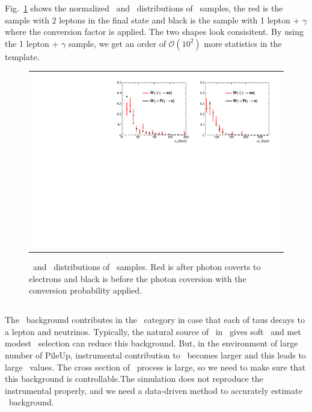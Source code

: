 Fig.~\ref{fig:wgamma_compare} shows the normalized \mll\ and \mt\ distributions 
of \wgamma\ samples, the red is the sample with 2 leptons in the final state 
and black is the sample with 1 lepton + $\gamma$ where the conversion 
factor is applied. The two shapes look consisitent. 
By using the 1 lepton + $\gamma$ sample, we get an order of $\mathcal{O}(10^2)$ 
more statistics in the template.  
\begin{figure}[htp] 
\centering 
\begin{tabular}{c} 
\includegraphics[width=1.0\textwidth]{figures/Wgamma_0j_of.pdf} 
\end{tabular} 
\caption{\mll\ and \mt\ distributions of \wgamma\ samples. 
Red is after photon coverts to electrons and black is before the photon coversion 
with the conversion probability applied. }
\label{fig:wgamma_compare} 
\end{figure}  



\subsection{\ztt}

The \ztt\ background contributes in the \DF\ category in case that 
each of taus decays to a lepton and neutrinos. Typically, the natural source 
of \met\ in \ztt\ gives soft \met\ and met modest \met\ selection can  
reduce this background. But, in the environment of large number of PileUp, 
instrumental contribution to \met\ becomes larger and this leads to large 
\met\ values. The cross section of \ztt\ process is large, so we need to make 
sure that this background is controllable.The simulation does not reproduce 
the instrumental \met properly, and we need a data-driven method to 
accurately estimate \ztt\ background. 

